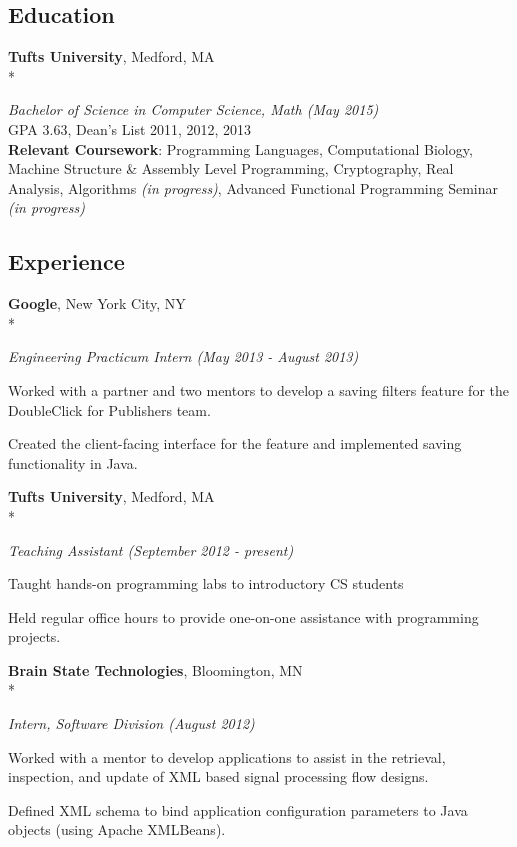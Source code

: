 \documentclass{article}
\newcommand{\position}[2]{
  \textit{#1 (#2)}
}
\newcommand{\affiliation}[2]{
  \textbf{#1}, #2 \\*
}
\newenvironment{achievements}{
  \begin{compactitem} }{
  \end{compactitem}
}
\newcommand{\skill}[2]{
  \textbf{#1}: #2
  \smallskip
}
\begin{document}
\subsection*{Education}
  \affiliation{Tufts University}                             {Medford, MA}
    \position{Bachelor of Science in Computer Science, Math} {May 2015} \\
  GPA 3.63, Dean's List 2011, 2012, 2013 \\
  \skill{Relevant Coursework}
        {Programming Languages, Computational Biology, Machine Structure \&
        Assembly Level Programming, Cryptography, Real Analysis, Algorithms
        \textit{(in progress)}, Advanced Functional Programming Seminar
        \textit{(in progress)}}

\subsection*{Experience}
  \affiliation{Google}                       {New York City, NY}
    \position {Engineering Practicum Intern} {May 2013 - August 2013}
    \begin{achievements}
      \item Worked with a partner and two mentors to develop a
            saving filters feature for the \\ DoubleClick for Publishers team.
      \item Created the client-facing interface for the feature and
      implemented saving functionality in Java.
    \end{achievements}
    \smallskip

  \affiliation{Tufts University}   {Medford, MA}
    \position {Teaching Assistant} {September 2012 - present}
    \begin{achievements}
      \item Taught hands-on programming labs to introductory CS students
      \item Held regular office hours to provide one-on-one assistance with
            programming projects.
    \end{achievements}
    \smallskip

  \affiliation{Brain State Technologies}  {Bloomington, MN}
    \position {Intern, Software Division} {August 2012}
    \begin{achievements}
      \item Worked with a mentor to develop applications to assist in the
            retrieval, inspection, and update of XML based signal processing 
            flow designs.
      \item Defined XML schema to bind application configuration parameters to 
            Java objects (using Apache XMLBeans).
    \end{achievements}
\end{document}
